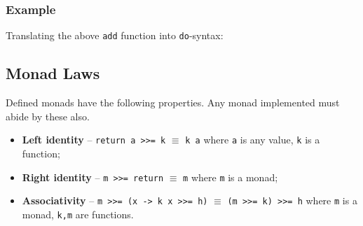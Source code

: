 \subsubsection{Example}
Translating the above \texttt{add} function into \texttt{do}-syntax:

\subsection{Monad Laws}
Defined monads have the following properties. Any monad implemented must abide by these also.
\begin{itemize}
  \item \textbf{Left identity} -- \texttt{return a >>= k} $\equiv$ \texttt{k a} where \texttt{a} is any value, \texttt{k} is a function;
  \item \textbf{Right identity} -- \texttt{m >>= return} $\equiv$ \texttt{m} where \texttt{m} is a monad;
  \item \textbf{Associativity} -- \texttt{m >>= (x -> k x >>= h)} $\equiv$ \texttt{(m >>= k) >>= h} where \texttt{m} is a monad, \texttt{k,m} are functions.
\end{itemize}